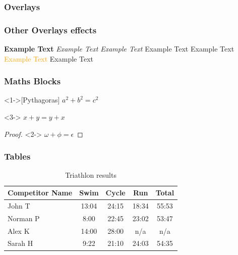 \documentclass{beamer} %
\begin{document}
\begin{frame}
    \frametitle{Overlays}
\end{frame}

\begin{frame}
    \frametitle{Other Overlays effects}
    \textbf<2>{Example Text}
    \textit<2>{Example Text}
    \textsl<2>{Example Text}
    \textrm<2>{Example Text}
    \textsf<2>{Example Text}
    \textcolor<2>{orange}{Example Text}
    \alert<2>{Example Text}
\end{frame}

\begin{frame}
    \frametitle{Maths Blocks}
    \begin{theorem}<1->[Pythagoras] 
        $ a^2 + b^2 = c^2$
    \end{theorem}
    \begin{corollary}<3->
        $ x + y = y + x  $
    \end{corollary}
    \begin{proof}<2->
        $\omega +\phi = \epsilon $
    \end{proof}
\end{frame}


\begin{frame}
\frametitle{Tables}
\begin{table}
\begin{tabular}{l | c | c | c | c }
Competitor Name & Swim & Cycle & Run & Total \\
\hline \hline
John T & 13:04 & 24:15 & 18:34 & 55:53  \\ 
Norman P & 8:00 & 22:45 & 23:02 & 53:47 \\
Alex K & 14:00 & 28:00 & n/a & n/a \\
Sarah H & 9:22 & 21:10 & 24:03 & 54:35 
\end{tabular}
\caption{Triathlon results}
\end{table}
\end{frame}
\end{document}
